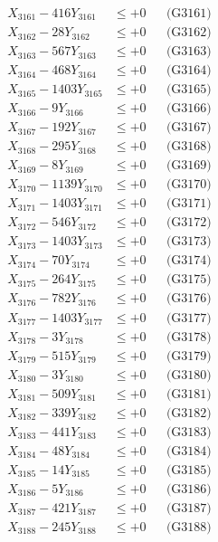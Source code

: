 \documentclass[a4paper,10pt]{article}
\begin{document}
{\begin{align}
\allowbreak
X_{3161} - 416Y_{3161} &\leq +0 && \text{(G3161)} \\
X_{3162} - 28Y_{3162} &\leq +0 && \text{(G3162)} \\
X_{3163} - 567Y_{3163} &\leq +0 && \text{(G3163)} \\
X_{3164} - 468Y_{3164} &\leq +0 && \text{(G3164)} \\
X_{3165} - 1403Y_{3165} &\leq +0 && \text{(G3165)} \\
X_{3166} - 9Y_{3166} &\leq +0 && \text{(G3166)} \\
X_{3167} - 192Y_{3167} &\leq +0 && \text{(G3167)} \\
X_{3168} - 295Y_{3168} &\leq +0 && \text{(G3168)} \\
X_{3169} - 8Y_{3169} &\leq +0 && \text{(G3169)} \\
X_{3170} - 1139Y_{3170} &\leq +0 && \text{(G3170)} \\
\allowbreak
X_{3171} - 1403Y_{3171} &\leq +0 && \text{(G3171)} \\
X_{3172} - 546Y_{3172} &\leq +0 && \text{(G3172)} \\
X_{3173} - 1403Y_{3173} &\leq +0 && \text{(G3173)} \\
X_{3174} - 70Y_{3174} &\leq +0 && \text{(G3174)} \\
X_{3175} - 264Y_{3175} &\leq +0 && \text{(G3175)} \\
X_{3176} - 782Y_{3176} &\leq +0 && \text{(G3176)} \\
X_{3177} - 1403Y_{3177} &\leq +0 && \text{(G3177)} \\
X_{3178} - 3Y_{3178} &\leq +0 && \text{(G3178)} \\
X_{3179} - 515Y_{3179} &\leq +0 && \text{(G3179)} \\
X_{3180} - 3Y_{3180} &\leq +0 && \text{(G3180)} \\
\allowbreak
X_{3181} - 509Y_{3181} &\leq +0 && \text{(G3181)} \\
X_{3182} - 339Y_{3182} &\leq +0 && \text{(G3182)} \\
X_{3183} - 441Y_{3183} &\leq +0 && \text{(G3183)} \\
X_{3184} - 48Y_{3184} &\leq +0 && \text{(G3184)} \\
X_{3185} - 14Y_{3185} &\leq +0 && \text{(G3185)} \\
X_{3186} - 5Y_{3186} &\leq +0 && \text{(G3186)} \\
X_{3187} - 421Y_{3187} &\leq +0 && \text{(G3187)} \\
X_{3188} - 245Y_{3188} &\leq +0 && \text{(G3188)} \\

\end{align}}
\end{document}
